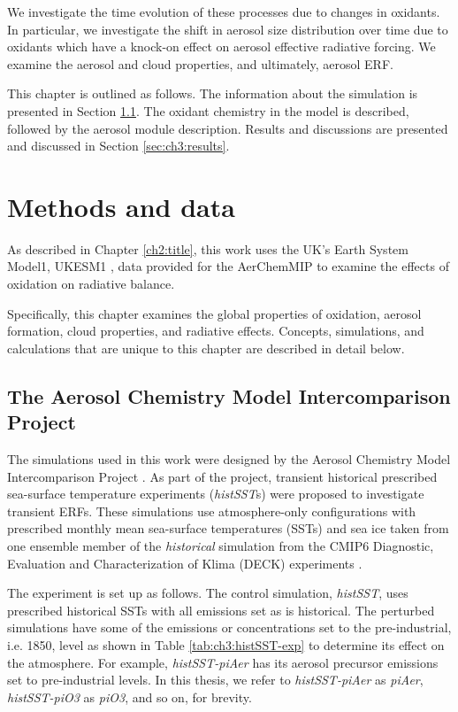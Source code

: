 We investigate the time evolution of these processes due to changes in oxidants. In particular, we investigate the shift in aerosol size distribution over time due to oxidants which have a knock-on effect on aerosol effective radiative forcing. We examine the aerosol and cloud properties, and ultimately, aerosol ERF. 


This chapter is outlined as follows. The information about the simulation is presented in Section \ref{sec:ch3:aerchemmip}. The oxidant chemistry in the model is described, followed by the aerosol module description. Results and discussions are presented and discussed in Section \ref{sec:ch3:results}.

\section{Methods and data}
\label{sec:ch3:methods}

As described in Chapter \ref{ch2:title}, this work uses the UK's Earth System Model1, UKESM1 \citep{sellarUKESM1DescriptionEvaluation2019}, data provided for the AerChemMIP \citep{collinsAerChemMIPQuantifyingEffects2017} to examine the effects of  oxidation on radiative balance. 

Specifically, this chapter examines the global properties of  oxidation, aerosol formation, cloud properties, and radiative effects. Concepts, simulations, and calculations that are unique to this chapter are described in detail below. 

\subsection{The Aerosol Chemistry Model Intercomparison Project}
\label{sec:ch3:aerchemmip}
The simulations used in this work were designed by the Aerosol Chemistry Model Intercomparison Project \citep[AerChemMIP;][]{collinsAerChemMIPQuantifyingEffects2017}. As part of the project, transient historical prescribed sea-surface temperature experiments (\textit{histSST}s) were proposed to investigate transient ERFs. These simulations use atmosphere-only configurations with prescribed monthly mean sea-surface temperatures (SSTs) and sea ice taken from one ensemble member of the \textit{historical} simulation from the CMIP6 Diagnostic, Evaluation and Characterization of Klima (DECK) experiments \citep{eyringOverviewCoupledModel2016}. 


The experiment is set up as follows. The control simulation, \textit{histSST}, uses prescribed historical SSTs with all emissions set as is historical. The perturbed simulations have some of the emissions or concentrations set to the pre-industrial, i.e. 1850, level as shown in Table \ref{tab:ch3:histSST-exp} to determine its effect on the atmosphere. For example, \textit{histSST-piAer} has its aerosol precursor emissions set to pre-industrial levels. In this thesis, we refer to \textit{histSST-piAer} as \textit{piAer}, \textit{histSST-piO3} as \textit{piO3}, and so on, for brevity. 


